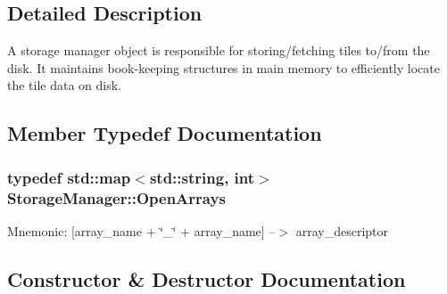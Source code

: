 \subsection{Detailed Description}
A storage manager object is responsible for storing/fetching tiles to/from the disk. It maintains book-\/keeping structures in main memory to efficiently locate the tile data on disk. 

\subsection{Member Typedef Documentation}
\hypertarget{classStorageManager_a029dfd29d09cbf61ea0c7151526d3924}{}
\subsubsection[{Open\+Arrays}]{\setlength{\rightskip}{0pt plus 5cm}typedef std\+::map$<$std\+::string, int$>$ {\bf Storage\+Manager\+::\+Open\+Arrays}}\label{classStorageManager_a029dfd29d09cbf61ea0c7151526d3924}
Mnemonic\+: \mbox{[}array\+\_\+name + \char`\"{}\+\_\+\char`\"{} + array\+\_\+name\mbox{]} --$>$ array\+\_\+descriptor 

\subsection{Constructor \& Destructor Documentation}
\hypertarget{classStorageManager_a7071b12eb47fd6a535a8d26ad466298e}{}
